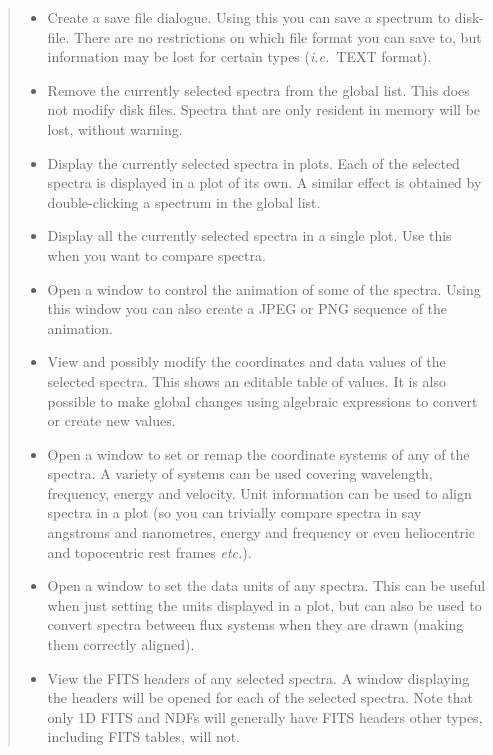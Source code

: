 \documentclass[twoside,11pt,nolof]{starlink}
\providecommand{\inline}[1]
        {\ifpdf
          \texttt{[image: sun243\_figures/\#1]}
          \else
          \texttt{[image: \#1]}
          \fi
        }
\providecommand{\ie}{\textit{i.e.}}
\providecommand{\etc}{\textit{etc.}}
\begin{document}
\begin{quote}
\begin{itemize}
  \item[\inline{savefile}] Create a save file dialogue. Using this you can
  save a spectrum to disk-file. There are no restrictions on which file
  format you can save to, but information may be lost for certain types
  (\ie\ TEXT format).

  \item[\inline{remove}] Remove the currently selected spectra from the
  global list. This does not modify disk files. Spectra that are only
  resident in memory will be lost, without warning.

  \item[\inline{display}] Display the currently selected spectra in
  plots. Each of the selected spectra is displayed in a plot of its
  own. A similar effect is obtained by double-clicking a spectrum in the
  global list.

  \item[\inline{multidisplay}] Display all the currently selected
  spectra in a single plot. Use this when you want to compare spectra.

  \item[\inline{animate}] Open a window to control the animation of some
  of the spectra. Using this window you can also create a JPEG or PNG
  sequence of the animation.

  \item[\inline{table}] View and possibly modify the coordinates and
  data values of the selected spectra. This shows an editable table of
  values. It is also possible to make global changes using
  algebraic expressions to convert or create new values.

  \item[\inline{xunits}] Open a window to set or remap the coordinate
  systems of any of the spectra. A variety of systems can be used
  covering wavelength, frequency, energy and velocity. Unit
  information can be used to align spectra in a plot (so you can
  trivially compare spectra in say angstroms and nanometres,
  energy and frequency or even heliocentric and topocentric rest frames
  \etc).

  \item[\inline{yunits}] Open a window to set the data units of any spectra.
  This can be useful when just setting the units displayed in a plot, but
  can also be used to convert spectra between flux systems when they are
  drawn (making them correctly aligned).

  \item[\inline{fits}] View the FITS headers of any selected spectra.
  A window displaying the headers will be opened for each of the selected
  spectra. Note that only 1D FITS and NDFs will generally have FITS headers
  other types, including FITS tables, will not.


\end{itemize}
\end{quote}
\end{document}
